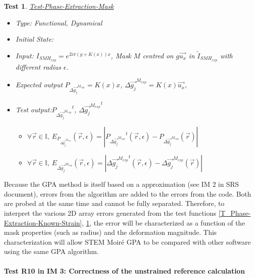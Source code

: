 \documentclass[12pt, titlepage]{article}
\newcommand{\progname}{STEM Moir{\'e} GPA}
\newtheorem{Test}{Test}
\begin{document}
\begin{Test}\normalfont\underline{Test-Phase-Extraction-Mask}
\label{T_Phase-Extraction-Mask}
\begin{itemize}
\item Type: Functional, Dynamical
\item Initial State:
\item Input: $I_{SMH_{exp}}=e^{2i\pi (g+K(x))x}$, Mask $M$ centred on $g\overrightarrow{u_x}$ in $\widetilde{I}_{SMH_{exp}}$ with different radius $\epsilon$. 
\item Expected output $P_{\Delta \overrightarrow{g_{j}}^{M_{exp}}}=K(x)x$, $\Delta \overrightarrow{g_{j}}^{M_{exp}}=K(x)\overrightarrow{u_x}$, 
\item Test output:${P_{\Delta \overrightarrow{g_{j}}^{M_{exp}}}}^{t}$, $\Delta {\overrightarrow{g_{j}}^{M_{exp}}}^{t}$
	\begin{itemize}
	\item $\forall \vec{r} \in \mathbb{I}, \ E_{P_{\Delta \overrightarrow{g_{j}}^{M_{exp}}}}(\vec{r},\epsilon)=|{P_{\Delta \overrightarrow{g_{j}}^{M_{exp}}}}^{t}(\vec{r},\epsilon)-P_{\Delta \overrightarrow{g_{j}}^{M_{exp}}}(\vec{r})|$
	\item $\forall \vec{r} \in \mathbb{I}, \ E_{\Delta {\overrightarrow{g_{j}}^{M_{exp}}}}(\vec{r},\epsilon)=|{\Delta {\overrightarrow{g_{j}}^{M_{exp}}}}^t(\vec{r},\epsilon)-{\Delta {\overrightarrow{g_{j}}^{M_{exp}}}}(\vec{r})|$
	\end{itemize}
\end{itemize}
\end{Test}						

Because the GPA method is itself based on a approximation (see IM 2 in SRS document), errors from the algorithm are added to the errors from the code. Both are probed at the same time and cannot be fully separated. Therefore, to interpret the various 2D array errors generated from the test functions \cref{T_Phase-Extraction-Known-Strain}, \cref{T_Phase-Extraction-Mask}, the error will be characterized as a function of the mask properties (such as radius) and the deformation magnitude. This characterization will allow \progname{} to be compared with other software using the same GPA algorithm.

\paragraph{Test R10 in IM 3: Correctness of the unstrained reference calculation}	
\end{document}

